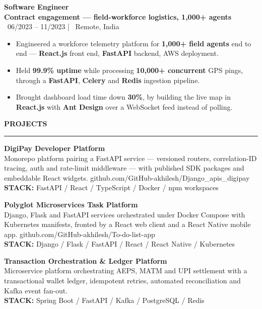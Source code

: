 \documentclass[10pt]{article}
\newcommand{\resumesection}[1]{%
  \vspace{6pt}%
  {\fontfamily{phv}\selectfont\textbf{\large\MakeUppercase{#1}}}%
  \vspace{2pt}%
  \hrule%
  \vspace{4pt}%
}
\begin{document}
\vspace{4pt}
{\textbf{Software Engineer}} \\
{\textbf{\textcolor{primaryblue}{Contract engagement --- field-workforce logistics, 1,000+ agents}}} \\
{\footnotesize\textcolor{primaryblue}{\faCalendar*}~06/2023 -- 11/2023 \quad | \quad \textcolor{primaryblue}{\faMapMarker*}~Remote, India}
\begin{itemize}
    \item Engineered a workforce telemetry platform for \textbf{1,000+ field agents} end to end --- \textbf{React.js} front end, \textbf{FastAPI} backend, AWS deployment.
    \item Held \textbf{99.9\% uptime} while processing \textbf{10,000+ concurrent} GPS pings, through a \textbf{FastAPI}, \textbf{Celery} and \textbf{Redis} ingestion pipeline.
    \item Brought dashboard load time down \textbf{30\%}, by building the live map in \textbf{React.js} with \textbf{Ant Design} over a WebSocket feed instead of polling.
\end{itemize}

\resumesection{Projects}
{\textbf{DigiPay Developer Platform}} \\
{\small Monorepo platform pairing a FastAPI service --- versioned routers, correlation-ID tracing, auth and rate-limit middleware --- with published SDK packages and embeddable React widgets. github.com/GitHub-akhilesh/Django\_apis\_digipay} \\
{\footnotesize\textbf{STACK:} FastAPI / React / TypeScript / Docker / npm workspaces}

\vspace{4pt}
{\textbf{Polyglot Microservices Task Platform}} \\
{\small Django, Flask and FastAPI services orchestrated under Docker Compose with Kubernetes manifests, fronted by a React web client and a React Native mobile app. github.com/GitHub-akhilesh/To-do-list-app} \\
{\footnotesize\textbf{STACK:} Django / Flask / FastAPI / React / React Native / Kubernetes}

\vspace{4pt}
{\textbf{Transaction Orchestration \& Ledger Platform}} \\
{\small Microservice platform orchestrating AEPS, MATM and UPI settlement with a transactional wallet ledger, idempotent retries, automated reconciliation and Kafka event fan-out.} \\
{\footnotesize\textbf{STACK:} Spring Boot / FastAPI / Kafka / PostgreSQL / Redis}
\end{document}
